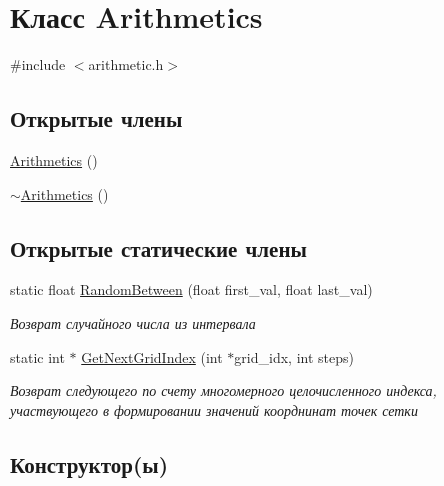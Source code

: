 \hypertarget{class_arithmetics}{}\section{Класс Arithmetics}
\label{class_arithmetics}


{\ttfamily \#include $<$arithmetic.\+h$>$}

\subsection*{Открытые члены}
\begin{DoxyCompactItemize}
\item 
\hyperlink{class_arithmetics_afdaeab6d774c7f71d0abbf3723c2c76d}{Arithmetics} ()
\item 
\hyperlink{class_arithmetics_a93e2f5a9112c403aaceef9e1913dbd96}{$\sim$\+Arithmetics} ()
\end{DoxyCompactItemize}
\subsection*{Открытые статические члены}
\begin{DoxyCompactItemize}
\item 
static float \hyperlink{class_arithmetics_a2496e1ae47ea96f3abd3dffc3b43d841}{Random\+Between} (float first\+\_\+val, float last\+\_\+val)
\begin{DoxyCompactList}\small\item\em Возврат случайного числа из интервала \end{DoxyCompactList}\item 
static int $\ast$ \hyperlink{class_arithmetics_a06388394a8a4162176567d6735fb4a39}{Get\+Next\+Grid\+Index} (int $\ast$grid\+\_\+idx, int steps)
\begin{DoxyCompactList}\small\item\em Возврат следующего по счету многомерного целочисленного индекса, участвующего в формировании значений коорднинат точек сетки \end{DoxyCompactList}\end{DoxyCompactItemize}


\subsection{Конструктор(ы)}
\hypertarget{class_arithmetics_afdaeab6d774c7f71d0abbf3723c2c76d}{}
